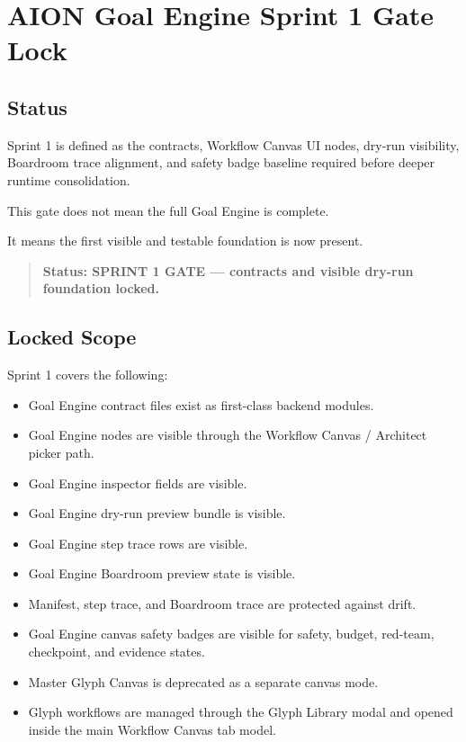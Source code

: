 \section{AION Goal Engine Sprint 1 Gate Lock}
\label{sec:aion-goal-engine-sprint1-gate-lock}

\subsection{Status}

Sprint 1 is defined as the contracts, Workflow Canvas UI nodes, dry-run visibility, Boardroom trace alignment, and safety badge baseline required before deeper runtime consolidation.

This gate does not mean the full Goal Engine is complete.

It means the first visible and testable foundation is now present.

\begin{quote}
\textbf{Status: SPRINT 1 GATE --- contracts and visible dry-run foundation locked.}
\end{quote}

\subsection{Locked Scope}

Sprint 1 covers the following:

\begin{itemize}
  \item Goal Engine contract files exist as first-class backend modules.
  \item Goal Engine nodes are visible through the Workflow Canvas / Architect picker path.
  \item Goal Engine inspector fields are visible.
  \item Goal Engine dry-run preview bundle is visible.
  \item Goal Engine step trace rows are visible.
  \item Goal Engine Boardroom preview state is visible.
  \item Manifest, step trace, and Boardroom trace are protected against drift.
  \item Goal Engine canvas safety badges are visible for safety, budget, red-team, checkpoint, and evidence states.
  \item Master Glyph Canvas is deprecated as a separate canvas mode.
  \item Glyph workflows are managed through the Glyph Library modal and opened inside the main Workflow Canvas tab model.
\end{itemize}

